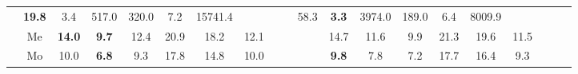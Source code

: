 \documentclass[french,10pt]{article}
\begin{document}
\begin{landscape}
\begin{longtable}{ l  c | c c c | c c c | c c c | c c c | c c c | c c c | }
                    &                     \textbf{ 19.8}
     & {\footnotesize     3.4
    } & {\footnotesize     517.0
     }
    
    
                    &                     320.0
     & {\footnotesize     7.2
    } & {\footnotesize     15741.4
     }
    
    
                    & & &

                    &                     58.3
     & {\footnotesize     \textbf{ 3.3}
    } & {\footnotesize     3974.0
     }
    
    
                    &                     189.0
     & {\footnotesize     6.4
    } & {\footnotesize     8009.9
     }
    
    
                    & & &

                    \\*
                        & {\small Me  }

                    &                     \textbf{ 14.0}
     & {\footnotesize     \textbf{ 9.7}
    } & {\footnotesize     12.4
     }
    
    
                    &                     20.9
     & {\footnotesize     18.2
    } & {\footnotesize     12.1
     }
    
    
                    & & &

                    &                     14.7
     & {\footnotesize     11.6
    } & {\footnotesize     9.9
     }
    
    
                    &                     21.3
     & {\footnotesize     19.6
    } & {\footnotesize     11.5
     }
    
    
                    & & &

                    \\*
                        & {\small Mo  }

                    &                     10.0
     & {\footnotesize     \textbf{ 6.8}
    } & {\footnotesize     9.3
     }
    
    
                    &                     17.8
     & {\footnotesize     14.8
    } & {\footnotesize     10.0
     }
    
    
                    & & &

                    &                     \textbf{ 9.8}
     & {\footnotesize     7.8
    } & {\footnotesize     7.2
     }
    
    
                    &                     17.7
     & {\footnotesize     16.4
    } & {\footnotesize     9.3
     }
    

\end{longtable}
\end{landscape}
\end{document}
